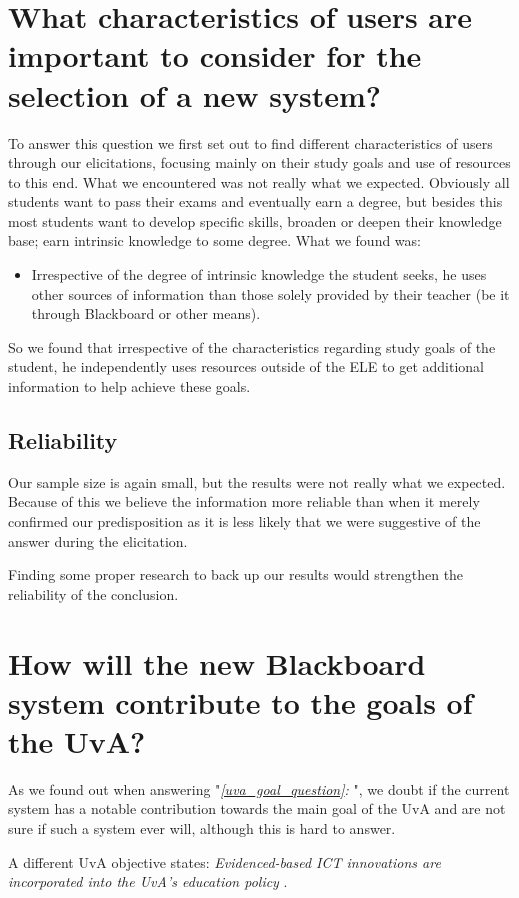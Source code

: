 \section{What characteristics of users are important to consider for the selection of a new system?}
To answer this question we first set out to find different characteristics of users through our elicitations, focusing mainly on their study goals and use of resources to this end. What we encountered was not really what we expected. Obviously all students want to pass their exams and eventually earn a degree, but besides this most students want to develop specific skills, broaden or deepen their knowledge base; earn intrinsic knowledge to some degree. What we found was:
\begin{itemize}
	\item Irrespective of the degree of intrinsic knowledge the student seeks, he uses other sources of information than those solely provided by their teacher (be it through Blackboard or other means).
\end{itemize}

So we found that irrespective of the characteristics regarding study goals of the student, he independently uses resources outside of the ELE to get additional information to help achieve these goals.

\subsection{Reliability}
Our sample size is again small, but the results were not really what we expected. Because of this we believe the information more reliable than when it merely confirmed our predisposition as it is less likely that we were suggestive of the answer during the elicitation.

Finding some proper research to back up our results would strengthen the reliability of the conclusion.


\section{How will the new Blackboard system contribute to the goals of the UvA?}
As we found out when answering "\emph{\ref{uva_goal_question}: }", we doubt if the current system has a notable contribution towards the main goal of the UvA and are not sure if such a system ever will, although this is hard to answer.

A different UvA objective states: \emph{Evidenced-based ICT innovations are	incorporated into the UvA’s education policy} \cite{uva_strategic_plan}.

